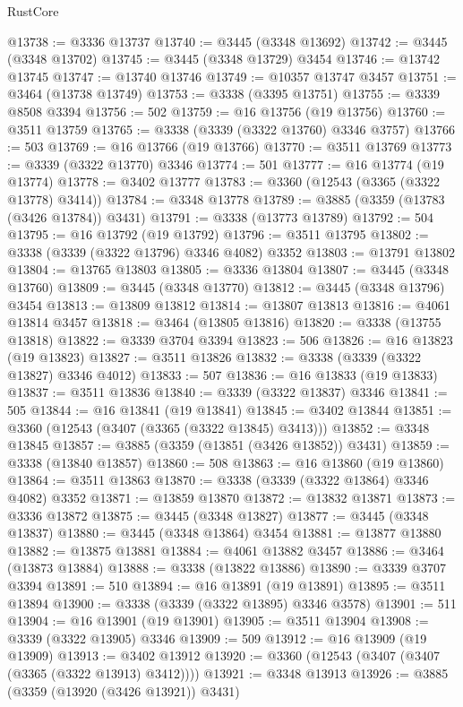 \begin{lexlean}{RustCore}
\begin{coremodule}
@13738 := @3336 @13737
@13740 := @3445 (@3348 @13692)
@13742 := @3445 (@3348 @13702)
@13745 := @3445 (@3348 @13729) @3454
@13746 := @13742 @13745
@13747 := @13740 @13746
@13749 := @10357 @13747 @3457
@13751 := @3464 (@13738 @13749)
@13753 := @3338 (@3395 @13751)
@13755 := @3339 @8508 @3394
@13756 := 502
@13759 := @16 @13756 (@19 @13756)
@13760 := @3511 @13759
@13765 := @3338 (@3339 (@3322 @13760) @3346 @3757)
@13766 := 503
@13769 := @16 @13766 (@19 @13766)
@13770 := @3511 @13769
@13773 := @3339 (@3322 @13770) @3346
@13774 := 501
@13777 := @16 @13774 (@19 @13774)
@13778 := @3402 @13777
@13783 := @3360 (@12543 (@3365 (@3322 @13778) @3414))
@13784 := @3348 @13778
@13789 := @3885 (@3359 (@13783 (@3426 @13784)) @3431)
@13791 := @3338 (@13773 @13789)
@13792 := 504
@13795 := @16 @13792 (@19 @13792)
@13796 := @3511 @13795
@13802 := @3338 (@3339 (@3322 @13796) @3346 @4082) @3352
@13803 := @13791 @13802
@13804 := @13765 @13803
@13805 := @3336 @13804
@13807 := @3445 (@3348 @13760)
@13809 := @3445 (@3348 @13770)
@13812 := @3445 (@3348 @13796) @3454
@13813 := @13809 @13812
@13814 := @13807 @13813
@13816 := @4061 @13814 @3457
@13818 := @3464 (@13805 @13816)
@13820 := @3338 (@13755 @13818)
@13822 := @3339 @3704 @3394
@13823 := 506
@13826 := @16 @13823 (@19 @13823)
@13827 := @3511 @13826
@13832 := @3338 (@3339 (@3322 @13827) @3346 @4012)
@13833 := 507
@13836 := @16 @13833 (@19 @13833)
@13837 := @3511 @13836
@13840 := @3339 (@3322 @13837) @3346
@13841 := 505
@13844 := @16 @13841 (@19 @13841)
@13845 := @3402 @13844
@13851 := @3360 (@12543 (@3407 (@3365 (@3322 @13845) @3413)))
@13852 := @3348 @13845
@13857 := @3885 (@3359 (@13851 (@3426 @13852)) @3431)
@13859 := @3338 (@13840 @13857)
@13860 := 508
@13863 := @16 @13860 (@19 @13860)
@13864 := @3511 @13863
@13870 := @3338 (@3339 (@3322 @13864) @3346 @4082) @3352
@13871 := @13859 @13870
@13872 := @13832 @13871
@13873 := @3336 @13872
@13875 := @3445 (@3348 @13827)
@13877 := @3445 (@3348 @13837)
@13880 := @3445 (@3348 @13864) @3454
@13881 := @13877 @13880
@13882 := @13875 @13881
@13884 := @4061 @13882 @3457
@13886 := @3464 (@13873 @13884)
@13888 := @3338 (@13822 @13886)
@13890 := @3339 @3707 @3394
@13891 := 510
@13894 := @16 @13891 (@19 @13891)
@13895 := @3511 @13894
@13900 := @3338 (@3339 (@3322 @13895) @3346 @3578)
@13901 := 511
@13904 := @16 @13901 (@19 @13901)
@13905 := @3511 @13904
@13908 := @3339 (@3322 @13905) @3346
@13909 := 509
@13912 := @16 @13909 (@19 @13909)
@13913 := @3402 @13912
@13920 := @3360 (@12543 (@3407 (@3407 (@3365 (@3322 @13913) @3412))))
@13921 := @3348 @13913
@13926 := @3885 (@3359 (@13920 (@3426 @13921)) @3431)

\end{coremodule}
\end{lexlean}
